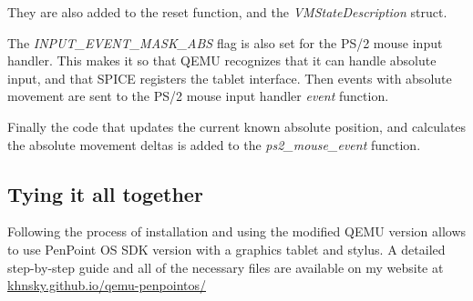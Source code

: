 %

\begin{codeblock}
    
\end{codeblock}

They are also added to the reset function, and the \emph{VMStateDescription}
struct.

\begin{codeblock}
    
\end{codeblock}

The \emph{INPUT\_EVENT\_MASK\_ABS} flag is also set for the PS/2 mouse input
handler.  This makes it so that QEMU recognizes that it can handle absolute
input, and that SPICE registers the tablet interface.  Then events with absolute
movement are sent to the PS/2 mouse input handler \emph{event} function.

\begin{codeblock}
    
\end{codeblock}

Finally the code that updates the current known absolute position, and
calculates the absolute movement deltas is added to the \emph{ps2\_mouse\_event}
function.

\begin{codeblock}
    
\end{codeblock}


\subsection{Tying it all together}


Following the process of installation and using the modified QEMU version allows
to use PenPoint OS SDK version with a graphics tablet and stylus.  A detailed
step-by-step guide and all of the necessary files are available on my website at
\url{khnsky.github.io/qemu-penpointos/}
